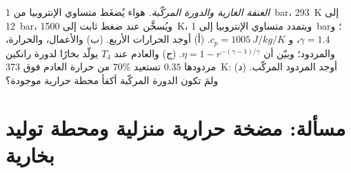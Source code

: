 \begin{exercise}[$\star\star\star$]\label{exo:b2:open-systems:12}
\emph{العنفة الغازية والدورة المركّبة.} هواء يُضغَط متساوي الإنتروبيا
من \qty{1}{bar}، \qty{293}{K} إلى \qty{12}{bar}، ويُسخَّن عند ضغط ثابت
إلى \qty{1500}{K}، ويتمدد متساوي الإنتروبيا إلى \qty{1}{bar}؛ و $\gamma = 1.4$،
و $c_p = \qty{1005}{J/kg/K}$. (أ) أوجد الحرارات الأربع. (ب) والأعمال،
والحرارة، والمردود؛ وبيّن أن $\eta = 1 - r^{-(\gamma - 1)/\gamma}$. (ج) والعادم
عند $T_4$ يولّد بخارًا لدورة رانكين مردودها $0.35$
تستعيد $70\%$ من حرارة العادم فوق \qty{373}{K}: أوجد المردود
المركّب. (د) ولمَ تكون الدورة المركّبة أكفأ محطة حرارية
موجودة؟
\end{exercise}

\section{مسألة: مضخة حرارية منزلية ومحطة توليد بخارية}

